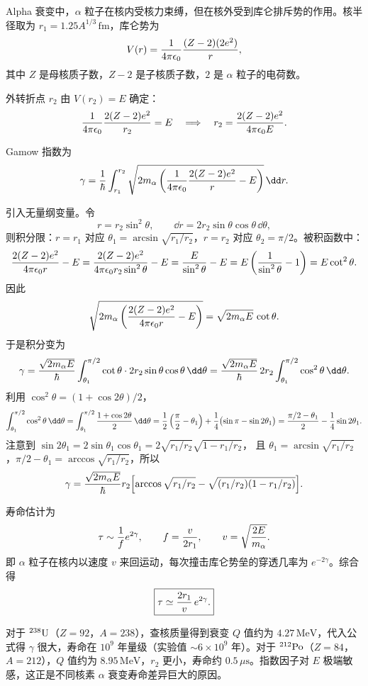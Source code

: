 \begin{solution}
Alpha 衰变中，$\alpha$ 粒子在核内受核力束缚，但在核外受到库仑排斥势的作用。核半径取为 $r_1=1.25A^{1/3}\,\mathrm{fm}$，库仑势为
\[
V(r)={1\over4\pi\epsilon_0}{(Z-2)(2e^2)\over r},
\]
其中 $Z$ 是母核质子数，$Z-2$ 是子核质子数，$2$ 是 $\alpha$ 粒子的电荷数。

外转折点 $r_2$ 由 $V(r_2)=E$ 确定：
\[
{1\over4\pi\epsilon_0}{2(Z-2)e^2\over r_2}=E
\quad\Longrightarrow\quad
r_2={2(Z-2)e^2\over4\pi\epsilon_0 E}.
\]

Gamow 指数为
\[
\gamma={1\over\hbar}\int_{r_1}^{r_2}
\sqrt{2m_\alpha\left({1\over4\pi\epsilon_0}{2(Z-2)e^2\over r}-E\right)}\,\dd r.
\]

引入无量纲变量。令
\[
r=r_2\sin^2\theta,
\qquad\dd r=2r_2\sin\theta\cos\theta\,\dd\theta,
\]
则积分限：$r=r_1$ 对应 $\theta_1=\arcsin\sqrt{r_1/r_2}$，$r=r_2$ 对应 $\theta_2=\pi/2$。被积函数中：
\[
{2(Z-2)e^2\over4\pi\epsilon_0 r}-E
={2(Z-2)e^2\over4\pi\epsilon_0 r_2\sin^2\theta}-E
={E\over\sin^2\theta}-E
=E\left({1\over\sin^2\theta}-1\right)
=E\cot^2\theta.
\]
因此
\[
\sqrt{2m_\alpha\left({2(Z-2)e^2\over4\pi\epsilon_0 r}-E\right)}
=\sqrt{2m_\alpha E}\,\cot\theta.
\]
于是积分变为
\[
\gamma={\sqrt{2m_\alpha E}\over\hbar}
\int_{\theta_1}^{\pi/2}\cot\theta\cdot 2r_2\sin\theta\cos\theta\,\dd\theta
={\sqrt{2m_\alpha E}\over\hbar}\,2r_2
\int_{\theta_1}^{\pi/2}\cos^2\theta\,\dd\theta.
\]
利用 $\cos^2\theta=(1+\cos2\theta)/2$，
\[
\int_{\theta_1}^{\pi/2}\cos^2\theta\,\dd\theta
=\int_{\theta_1}^{\pi/2}{1+\cos2\theta\over2}\,\dd\theta
={1\over2}\left({\pi\over2}-\theta_1\right)
+{1\over4}\bigl(\sin\pi-\sin2\theta_1\bigr)
={\pi/2-\theta_1\over2}-{1\over4}\sin2\theta_1.
\]
注意到 $\sin2\theta_1=2\sin\theta_1\cos\theta_1=2\sqrt{r_1/r_2}\sqrt{1-r_1/r_2}$，
且 $\theta_1=\arcsin\sqrt{r_1/r_2}$，$\pi/2-\theta_1=\arccos\sqrt{r_1/r_2}$，所以
\[
\gamma={\sqrt{2m_\alpha E}\over\hbar}r_2
\Bigl[\arccos\sqrt{r_1/r_2}-\sqrt{(r_1/r_2)(1-r_1/r_2)}\Bigr].
\]

寿命估计为
\[
\tau\sim{1\over f}e^{2\gamma},
\qquad f={v\over2r_1},
\qquad v=\sqrt{2E\over m_\alpha}.
\]
即 $\alpha$ 粒子在核内以速度 $v$ 来回运动，每次撞击库仑势垒的穿透几率为 $e^{-2\gamma}$。综合得
\[
\boxed{\tau\simeq {2r_1\over v}\,e^{2\gamma}.}
\]

对于 $^{238}{\rm U}$（$Z=92$，$A=238$），查核质量得到衰变 $Q$ 值约为 $4.27\,\mathrm{MeV}$，代入公式得 $\gamma$ 很大，寿命在 $10^9$ 年量级（实验值 $\sim6\times10^9$ 年）。对于 $^{212}{\rm Po}$（$Z=84$，$A=212$），$Q$ 值约为 $8.95\,\mathrm{MeV}$，$r_2$ 更小，寿命约 $0.5\,\mu\mathrm{s}$。指数因子对 $E$ 极端敏感，这正是不同核素 $\alpha$ 衰变寿命差异巨大的原因。
\end{solution}

